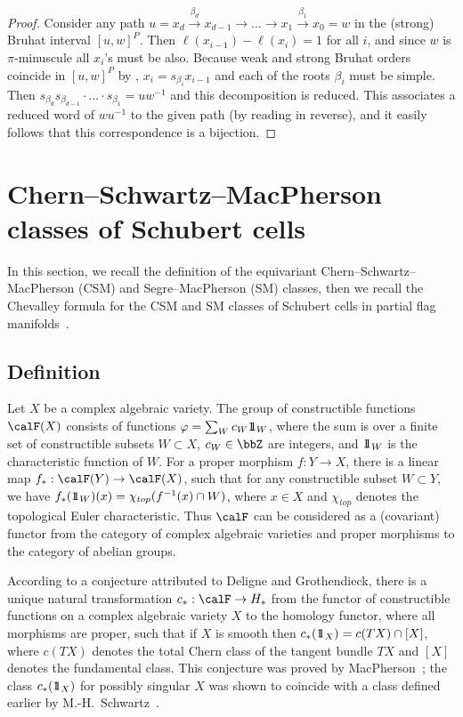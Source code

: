 \documentclass[11pt]{article}
\theoremstyle{definition}
\numberwithin{equation}{section}
\newcommand{\one}{1\hskip-3.5pt1}
\begin{document}
\begin{proof} Consider any path 
	$u=x_d\overset{\beta_d}{\to} x_{d-1}\to \ldots \to x_1\overset{\beta_1}{\to} x_0=w$
	in the (strong) Bruhat interval $[u,w]^P$. Then $\ell(x_{i-1}) - \ell(x_{i}) = 1$ for all $i$, and
	since $w$ is $\pi$-minuscule all $x_i$'s must be also. Because weak and strong 
	Bruhat orders coincide in $[u,w]^P$ by ,
	$x_{i} = s_{\beta_i} x_{i-1}$ and each of the roots $\beta_i$ must be simple. Then
	$s_{\beta_d}s_{\beta_{d-1}} \cdot \ldots \cdot s_{\beta_1}= uw^{-1}$ and this decomposition
	is reduced. This associates a reduced word of $wu^{-1}$ to the given path (by reading in reverse), 
	and it easily follows that this correspondence is a bijection.\end{proof}

\section{Chern--Schwartz--MacPherson classes of Schubert cells}\label{sec:eqCSM}
In this section, we recall the definition of the equivariant Chern--Schwartz--MacPherson (CSM) and Segre--MacPherson (SM) classes, 
then we recall the Chevalley formula for the CSM and SM classes of Schubert cells in partial flag manifolds~\cite{AMSS:shadows,su:quantum}.

\subsection{Definition}
Let $X$ be a complex algebraic variety. The group of constructible functions $\calF(X)$ consists of functions $\varphi = \sum_W c_W \one_W$, where the sum is over a finite set of constructible subsets $W \subset X$,
$c_W \in \bbZ$ are integers, and $\one_W$ is the characteristic function of $W$.
For a proper morphism $f:Y\rightarrow X$, there is a linear map \mbox{$f_*:\calF(Y)\rightarrow \calF(X)$}, such that for any constructible subset $W\subset Y$, we have $f_*(\one_W)(x)=\chi_{\textit{top}}(f^{-1}(x)\cap W)$, where $x\in X$ and $\chi_{\textit{top}}$ denotes the topological Euler characteristic.
Thus $\calF$ can be considered as a (covariant) functor from the category of complex algebraic varieties and 
proper morphisms to the category of abelian groups.

According to a conjecture attributed to Deligne and Grothendieck, there is a unique natural transformation $c_*: \calF \to H_*$ from the functor of constructible functions on a complex algebraic variety $X$ to the homology functor, where all morphisms are proper, such that if $X$ is smooth then $c_*(\one_X)=c(TX)\cap [X]$, {where $c(TX)$ denotes the total Chern class of the tangent bundle $TX$ and $[X]$ denotes the fundamental class}.  This conjecture was proved by MacPherson~\cite{macpherson:chern}; the class $c_*(\one_X)$ for possibly singular $X$ was shown to coincide with a class defined earlier by M.-H.~Schwartz~\cite{schwartz:1, schwartz:2, BS81}. 
\end{document}

